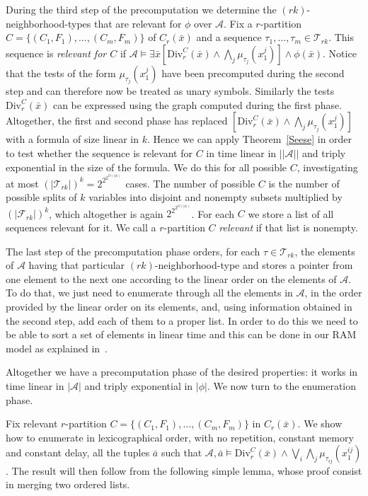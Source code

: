\documentclass{LMCS}
\newcommand\set[1]{\ensuremath{\{#1\}}\xspace}
\newcommand\cA{\ensuremath{{\mathcal A}}\xspace}
\newcommand{\T}{\ensuremath{{\mathcal T}}}
\newcommand{\F}{\ensuremath{{\mathcal F}}}
\begin{document}
  During the third step of the precomputation we determine the
  $(rk)$-neighborhood-types that are relevant for $\phi$ over \cA. Fix a $r$-partition
  $C=\set{(C_1,F_1),\ldots,(C_m,F_m)}$ of $C_r(\bar x)$ and a sequence
  $\tau_1,\ldots,\tau_m \in \T_{rk}$. This sequence is
  \emph{relevant for $C$} if $\cA \models \exists \bar x \left[\text{Div}_r^C(\bar x) \wedge
  \bigwedge_{j} \mu_{\tau_{j}}(x^{j}_1)\right]
  \wedge \phi(\bar x)$. Notice that the tests of the form
  $\mu_{\tau_{j}}(x^{j}_1)$ have been precomputed during the second step and
  can therefore now be treated as unary symbols. Similarly the tests
  $\text{Div}_r^C(\bar x)$ can be expressed using the graph computed during the
  first phase. Altogether, the first and second phase has replaced
  $\left[\text{Div}_r^C(\bar x) \wedge \bigwedge_{j} \mu_{\tau_{j}}(x^{j}_1)\right]$
  with a formula of size linear in $k$. Hence
  we can apply Theorem~\ref{Seese} in order to test whether the sequence is
  relevant for $C$ in time linear in $||\cA||$ and triply exponential in the size of
  the formula.  We do this for all possible $C$, investigating at most
  $(|\T_{rk}|)^k=2^{2^{2^{O(|\phi|)}}}$ cases. The number of possible $C$ is
  the number of possible splits of $k$ variables into disjoint and nonempty subsets
  multiplied by $(|\F_{rk}|)^k$, which altogether is again $2^{2^{2^{O(|\phi|)}}}$.
  For each $C$ we store a list of all sequences relevant for it. We call a $r$-partition
  $C$ \emph{relevant} if that list is nonempty.

  The last step of the precomputation phase orders, for each $\tau \in
  \T_{rk}$, the elements of $\cA$ having that particular
  $(rk)$-neighborhood-type and stores a pointer from one element to the next
  one according to the linear order on the elements of \cA. To do that, we just
  need to enumerate through all the elements in $\cA$, in the order provided by
  the linear order on its elements, and, using information obtained in the
  second step, add each of them to a proper list. In order to do this we need
  to be able to sort a set of elements in linear time and this can be done in
  our RAM model as explained in~\cite{Grandjean96}.

  Altogether we have a precomputation phase of the desired properties: it works
  in time linear in $|\cA|$ and triply exponential in $|\phi|$. We now turn to
  the enumeration phase.

  Fix relevant $r$-partition $C=\set{(C_1,F_1),\ldots,(C_m,F_m)}$ in $C_r(\bar x)$. We show how to
  enumerate in lexicographical order, with no repetition, constant memory and
  constant delay, all the tuples $\bar a$ such that $\cA,\bar a \models
  \text{Div}_r^C(\bar x) \wedge \bigvee_{i} \bigwedge_{j} \mu_{\tau_{ij}}(x^{ij}_1)$.
  The result will then follow from the following simple lemma, whose proof
  consist in merging two ordered lists.
\end{document}
